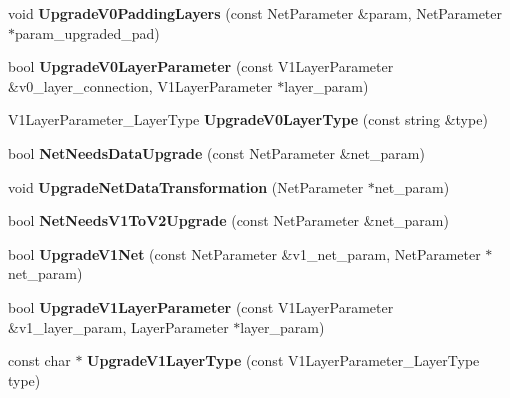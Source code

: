 \begin{DoxyCompactItemize}
\item 
void {\bfseries Upgrade\+V0\+Padding\+Layers} (const Net\+Parameter \&param, Net\+Parameter $\ast$param\+\_\+upgraded\+\_\+pad)\hypertarget{namespacecaffe_a772706c501bd181224155eeeb6cc9c04}{}\label{namespacecaffe_a772706c501bd181224155eeeb6cc9c04}

\item 
bool {\bfseries Upgrade\+V0\+Layer\+Parameter} (const V1\+Layer\+Parameter \&v0\+\_\+layer\+\_\+connection, V1\+Layer\+Parameter $\ast$layer\+\_\+param)\hypertarget{namespacecaffe_a1da77e6b99609141d5e5711592ba1771}{}\label{namespacecaffe_a1da77e6b99609141d5e5711592ba1771}

\item 
V1\+Layer\+Parameter\+\_\+\+Layer\+Type {\bfseries Upgrade\+V0\+Layer\+Type} (const string \&type)\hypertarget{namespacecaffe_ae9de23df62de2f7dc007884658bb161e}{}\label{namespacecaffe_ae9de23df62de2f7dc007884658bb161e}

\item 
bool {\bfseries Net\+Needs\+Data\+Upgrade} (const Net\+Parameter \&net\+\_\+param)\hypertarget{namespacecaffe_a69c568c8085cb6f7c852c41e16191030}{}\label{namespacecaffe_a69c568c8085cb6f7c852c41e16191030}

\item 
void {\bfseries Upgrade\+Net\+Data\+Transformation} (Net\+Parameter $\ast$net\+\_\+param)\hypertarget{namespacecaffe_af9531e2f63c4508260159a3c15ed21c2}{}\label{namespacecaffe_af9531e2f63c4508260159a3c15ed21c2}

\item 
bool {\bfseries Net\+Needs\+V1\+To\+V2\+Upgrade} (const Net\+Parameter \&net\+\_\+param)\hypertarget{namespacecaffe_a51bcf113dad8319320fdc202e8354257}{}\label{namespacecaffe_a51bcf113dad8319320fdc202e8354257}

\item 
bool {\bfseries Upgrade\+V1\+Net} (const Net\+Parameter \&v1\+\_\+net\+\_\+param, Net\+Parameter $\ast$net\+\_\+param)\hypertarget{namespacecaffe_a00b16f2666a71c575346f2d92373cfbc}{}\label{namespacecaffe_a00b16f2666a71c575346f2d92373cfbc}

\item 
bool {\bfseries Upgrade\+V1\+Layer\+Parameter} (const V1\+Layer\+Parameter \&v1\+\_\+layer\+\_\+param, Layer\+Parameter $\ast$layer\+\_\+param)\hypertarget{namespacecaffe_a6662809911b69625c70dcd6540e742d1}{}\label{namespacecaffe_a6662809911b69625c70dcd6540e742d1}

\item 
const char $\ast$ {\bfseries Upgrade\+V1\+Layer\+Type} (const V1\+Layer\+Parameter\+\_\+\+Layer\+Type type)\hypertarget{namespacecaffe_a0c08684e0bf64620ba505b112b27067b}{}\label{namespacecaffe_a0c08684e0bf64620ba505b112b27067b}


\end{DoxyCompactItemize}
